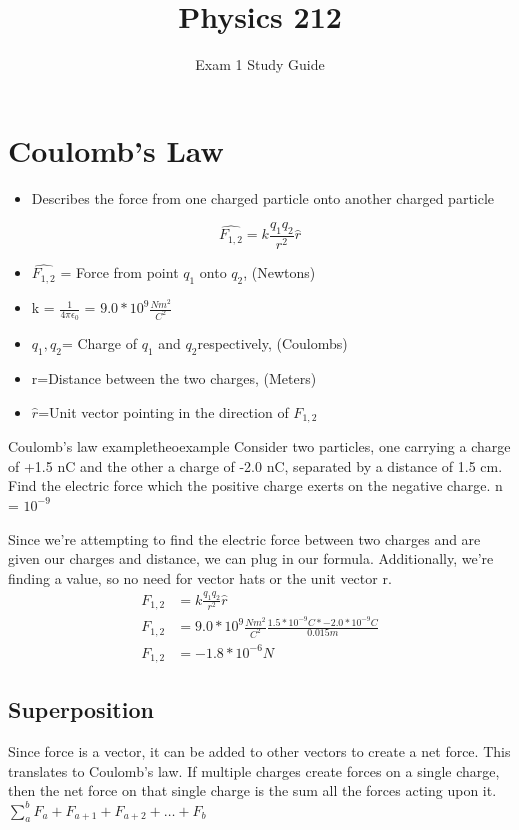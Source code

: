 \documentclass{article}
\title{Physics 212}
\date{\vspace{-5ex}}
\author{Exam 1 Study Guide}
\begin{document}
\maketitle

\section{Coulomb's Law} 
\begin{itemize}
	\item Describes the force from one charged particle onto another charged particle
\end{itemize}
		\[
	\hat{F_{1,2}}=k\frac{q_1q_2}{r^2}\hat{r}
\]
\begin{itemize}
	\item $\hat{F_{1,2}}$ = Force from point $q_1$ onto $q_2$, (Newtons)\\
	\item k = $\frac{1}{4\pi\epsilon_0}$ = $9.0*10^9\frac{Nm^2}{C^2}$\\
	\item $q_1,q_2$= Charge of $q_1$ and $q_2$respectively, (Coulombs)\\
	\item r=Distance between the two charges, (Meters)\\
	\item $\hat{r}$=Unit vector pointing in the direction of $F_{1,2}$
\end{itemize}



\begin{mytheo}{Coulomb's law example}{theoexample}
	Consider two particles, one carrying a charge of +1.5 nC and the other a charge of -2.0 nC, separated by a distance of 1.5 cm. Find the electric force which the positive charge exerts on the negative charge. n = $10^{-9}$
\end{mytheo}
Since we're attempting to find the electric force between two charges and are given our charges and distance, we can plug in our formula. Additionally, we're finding a value, so no need for vector hats or the unit vector r.\\
\begin{align*}
F_{1,2}&=k\frac{q_1q_2}{r^2}\hat{r}\\
F_{1,2}&=9.0*10^9 \frac{Nm^2}{C^2}\frac{1.5*10^{-9}C * -2.0 * 10^{-9}C}{0.015m}\\
F_{1,2}&= -1.8 * 10^{-6} N
\end{align*}

\subsection{Superposition}
Since force is a vector, it can be added to other vectors to create a net force. This translates to Coulomb's law. If multiple charges create forces on a single charge, then the net force on that single charge is the sum all the forces acting upon it.
$\sum_{a}^{b} F_{a} + F_{a+1} + F_{a+2} + \ldots + F_{b}$
\end{document}
